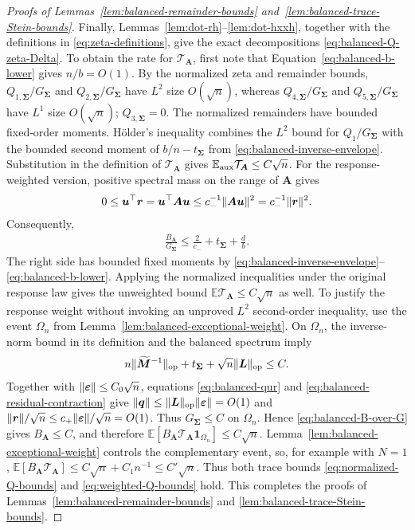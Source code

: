 \documentclass{article}
\theoremstyle{plain}
\theoremstyle{definition}
\theoremstyle{definition}
\DeclarePairedDelimiter\norm{\lVert}{\rVert}
\def\E{{\mathbb{E}}}
\def\mathbold{\boldsymbol}
\def\cal{\mathcal}
\def\bA{\mathbold{A}}\def\calA{{\cal A}}\def\scrA{{\mathscr A}}\def\Ahat{\widehat{A}}\def\Atil{{\widetilde A}}
\def\bL{\mathbold{L}}\def\hbL{{\widehat{\bL}}}\def\tbL{{\widetilde{\bL}}}
\def\bM{\mathbold{M}}\def\hbM{{\widehat{\bM}}}\def\tbM{{\widetilde{\bM}}}
\def\bq{\mathbold{q}}\def\qhat{\widehat{q}}\def\qtil{\widetilde{q}}\def\qbar{{\overline q}}
\def\br{\mathbold{r}}\def\rhat{\widehat{r}}\def\rtil{\widetilde{r}}\def\rbar{{\overline r}}
\def\bu{\mathbold{u}}\def\uhat{\widehat{u}}\def\util{\widetilde{u}}\def\ubar{{\overline u}}
\def\ep{\varepsilon}\def\eps{\epsilon}\def\veps{\varepsilon}
\def\bep{ {\mathbold{\ep} }}
\def\bSigma{\mathbold{\Sigma}}\def\hbSigma{{\widehat{\bSigma}}}
\begin{document}
\begin{proof}[Proofs of Lemmas~\ref{lem:balanced-remainder-bounds}
and~\ref{lem:balanced-trace-Stein-bounds}]
Finally, Lemmas~\ref{lem:dot-rh}--\ref{lem:dot-hxxh}, together with
the definitions in \eqref{eq:zeta-definitions}, give
the exact decompositions \eqref{eq:balanced-Q-zeta-Delta}.
To obtain the rate for $\mathcal T_{\bA}$, first note that
Equation~\eqref{eq:balanced-b-lower} gives $n/b=O(1)$.
By the normalized zeta and remainder bounds,
$Q_{1,\bSigma}/G_{\bSigma}$ and
$Q_{2,\bSigma}/G_{\bSigma}$ have $L^2$ size $O(\sqrt n)$,
whereas $Q_{4,\bSigma}/G_{\bSigma}$ and
$Q_{5,\bSigma}/G_{\bSigma}$ have $L^1$ size $O(\sqrt n)$;
$Q_{3,\bSigma}=0$.  The normalized remainders have bounded
fixed-order moments. H\"older's inequality combines the $L^2$
bound for $Q_1/G_{\bSigma}$ with the bounded second moment of
$b/n-t_{\bSigma}$ from \eqref{eq:balanced-inverse-envelope}.
Substitution in the definition of $\mathcal T_{\bA}$ gives
$\E_{\rm aux}\mathcal T_{\bA}\leq C\sqrt n$.
For the response-weighted version, positive spectral mass on the range of
$\bA$ gives
\begin{align*}
    0\leq\bu^\top\br=\bu^\top\bA\bu
    \leq c_-^{-1}\norm{\bA\bu}^2
    =c_-^{-1}\norm{\br}^2.
\end{align*}
Consequently,
\begin{align}
    \frac{B_{\bA}}{G_{\bSigma}}
    \leq \frac{2}{c_-}+t_{\bSigma}+\frac{d}{b}.
    \label{eq:balanced-B-over-G}
\end{align}
The right side has bounded fixed moments by
\eqref{eq:balanced-inverse-envelope}--\eqref{eq:balanced-b-lower}.  Applying
the normalized inequalities under the original response law gives the
unweighted bound $\E\mathcal T_{\bA}\leq C\sqrt n$ as well.  To justify the
response weight without invoking an unproved $L^2$ second-order inequality,
use the event $\Omega_n$ from
Lemma~\ref{lem:balanced-exceptional-weight}.  On $\Omega_n$, the inverse-norm bound in its definition and the
balanced spectrum imply
\begin{align*}
    n\norm{\widetilde{\bM}^{-1}}_{\rm op}
       +t_{\bSigma}+\sqrt n\norm{\bL}_{\rm op}\leq C.
\end{align*}
Together with $\norm{\bep}\leq C_0\sqrt n$, equations
\eqref{eq:balanced-qur} and \eqref{eq:balanced-residual-contraction} give
$\norm{\bq}\leq\norm{\bL}_{\rm op}\norm{\bep}=O(1)$ and
$\norm{\br}/\sqrt n\leq c_+\norm{\bep}/\sqrt n=O(1)$.
Thus $G_{\bSigma}\leq C$ on $\Omega_n$.
Hence \eqref{eq:balanced-B-over-G} gives
$B_{\bA}\leq C$, and therefore
$\E[B_{\bA}\mathcal T_{\bA}\boldsymbol{1}_{\Omega_n}]\leq C\sqrt n$.
Lemma~\ref{lem:balanced-exceptional-weight} controls the complementary event,
so, for example with $N=1$,
$\E[B_{\bA}\mathcal T_{\bA}]
\leq C\sqrt n+C_1n^{-1}\leq C'\sqrt n$.
Thus both trace bounds \eqref{eq:normalized-Q-bounds} and
\eqref{eq:weighted-Q-bounds} hold.
This completes the proofs of Lemmas~\ref{lem:balanced-remainder-bounds} and
\ref{lem:balanced-trace-Stein-bounds}.
\end{proof}
\end{document}
